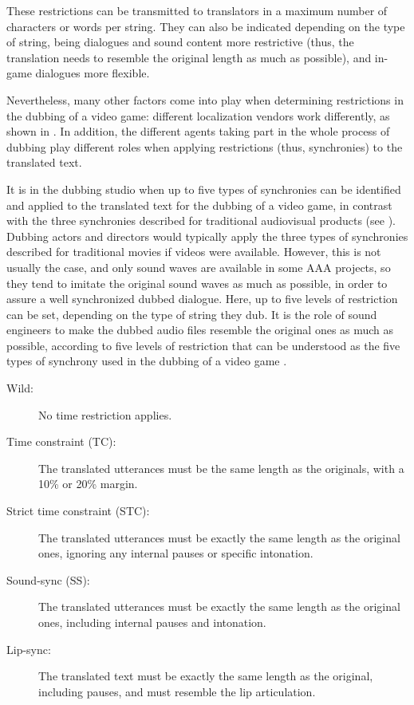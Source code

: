 \documentclass[output=paper]{langsci/langscibook}
\begin{document}
These restrictions can be transmitted to translators in a maximum number of characters or words per string. They can also be indicated depending on the type of string, being dialogues and sound content more restrictive (thus, the translation needs to resemble the original length as much as possible), and in-game dialogues more flexible.

Nevertheless, many other factors come into play when determining restrictions in the dubbing of a video game: different localization vendors work differently, as shown in \textcite{mejias19}. In addition, the different agents taking part in the whole process of dubbing play different roles when applying restrictions (thus, synchronies) to the translated text.

It is in the dubbing studio when up to five types of synchronies can be identified and applied to the translated text for the dubbing of a video game, in contrast with the three synchronies described for traditional audiovisual products (see ). Dubbing actors and directors would typically apply the three types of synchronies described for traditional movies if videos were available. However, this is not usually the case, and only sound waves are available in some AAA projects, so they tend to imitate the original sound waves as much as possible, in order to assure a well synchronized dubbed dialogue. Here, up to five levels of restriction can be set, depending on the type of string they dub. It is the role of sound engineers to make the dubbed audio files resemble the original ones as much as possible, according to five levels of restriction that can be understood as the five types of synchrony used in the dubbing of a video game \parencite[105]{mejias17}.

\begin{description}
  \item[Wild:] No time restriction applies. 
  \item[Time constraint (TC):] The translated utterances must be the same length as the originals, with a 10\% or 20\% margin.
  \item[Strict time constraint (STC):] The translated utterances must be exactly the same length as the original ones, ignoring any internal pauses or specific intonation.
  \item[Sound-sync (SS):] The translated utterances must be exactly the same length as the original ones, including internal pauses and intonation.
  \item[Lip-sync:] The translated text must be exactly the same length as the original, including pauses, and must resemble the lip articulation.
\end{description}
\end{document}
